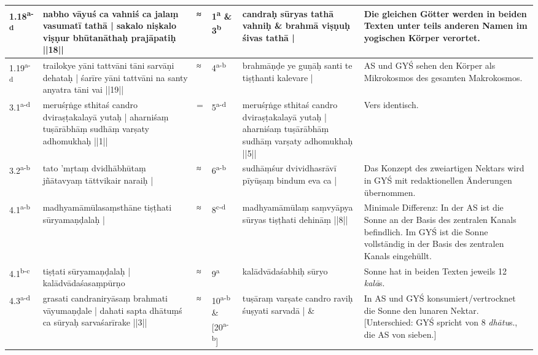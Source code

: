 \documentclass[a4paper,12pt]{article}
\begin{document}
{\begin{tabularx}{\textwidth}{p{}|p{}|p{}|p{}|p{}|p{}}
\hline
1.18\textsuperscript{a-d} & nabho vāyuś ca vahniś ca jalaṃ vasumatī tathā | sakalo niṣkalo viṣṇur bhūtanāthaḥ prajāpatiḥ ||18|| & ≈ & 1\textsuperscript{a} \& 3\textsuperscript{b} & candraḥ sūryas tathā vahniḥ \newline \& \newline brahmā viṣṇuḥ śivas tathā | & Die gleichen Götter werden in beiden Texten unter teils anderen Namen im yogischen Körper verortet. \\

\hline
1.19\textsuperscript{a-d} & trailokye yāni tattvāni tāni sarvāṇi dehataḥ | śarīre yāni tattvāni na santy anyatra tāni vai ||19|| & ≈ & 4\textsuperscript{a-b} & brahmāṇḍe ye guṇāḥ santi te tiṣṭhanti kalevare | & AS und GYŚ sehen den Körper als Mikrokosmos des gesamten Makrokosmos.\\

\hline
3.1\textsuperscript{a-d} & meruśṛṅge sthitaś candro dviraṣṭakalayā yutaḥ | aharniśaṃ tuṣārābhāṃ sudhāṃ varṣaty adhomukhaḥ ||1|| & = & 5\textsuperscript{a-d} & meruśṛṅge sthitaś candro dviraṣṭakalayā yutaḥ | aharniśaṃ tuṣārābhāṃ sudhāṃ varṣaty adhomukhaḥ ||5|| & Vers identisch.  \\

\hline
3.2\textsuperscript{a-b} & tato 'mṛtaṃ dvidhābhūtaṃ jñātavyaṃ tāttvikair naraiḥ | & ≈ & 6\textsuperscript{a-b} & sudhāṃśur dvividhasrāvī pīyūṣaṃ bindum eva ca | & Das Konzept des zweiartigen Nektars wird in GYŚ mit redaktionellen Änderungen übernommen.\\

\hline
4.1\textsuperscript{a-b} & madhyamāmūlasaṃsthāne tiṣṭhati sūryamaṇḍalaḥ | & ≈ & 8\textsuperscript{c-d} & madhyamāmūlaṃ saṃvyāpya sūryas tiṣṭhati dehināṃ ||8|| & Minimale Differenz: In der AS ist die Sonne an der Basis des zentralen Kanals befindlich. Im GYŚ ist die Sonne vollständig in der Basis des zentralen Kanals eingehüllt. \\

\hline
4.1\textsuperscript{b-c} & tiṣṭati sūryamaṇḍalaḥ | kalādvādaśasaṃpūrṇo  & ≈ & 9\textsuperscript{a} & kalādvādaśabhiḥ sūryo & Sonne hat in beiden Texten jeweils 12 \textit{kalā}s. \\

\hline
4.3\textsuperscript{a-d} & grasati candraniryāsaṃ brahmati vāyumaṇḍale | dahati sapta dhātuṃś ca sūryaḥ sarvaśarīrake ||3|| & ≈ & 10\textsuperscript{a-b} \& [20\textsuperscript{a-b}] & tuṣāraṃ varṣate candro raviḥ śuṣyati sarvadā | \newline \&   & In AS und GYŚ konsumiert/vertrocknet die Sonne den lunaren Nektar. [Unterschied: GYŚ spricht von 8 \textit{dhātu}s., die AS von sieben.] \\


\end{tabularx}}
\end{document}
